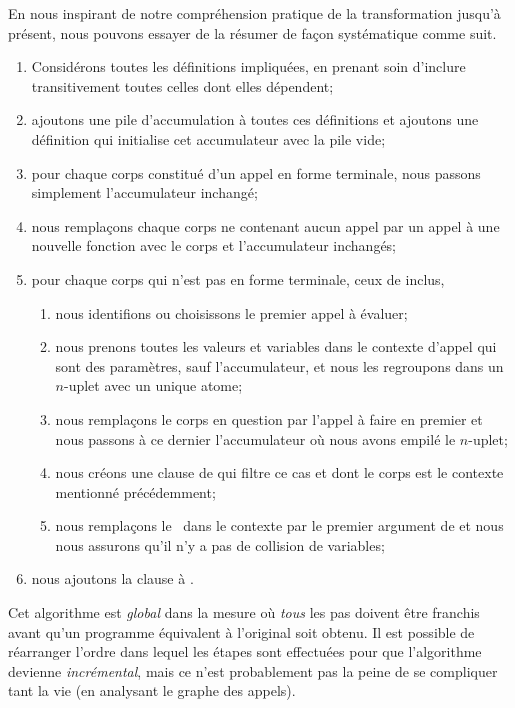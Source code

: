 En nous inspirant de notre compréhension pratique de la transformation
jusqu'à présent, nous pouvons essayer de la résumer de façon
systématique comme suit.
\begin{enumerate}

  \item Considérons toutes les définitions impliquées, en prenant soin
    d'inclure transitivement toutes celles dont elles dépendent;

  \item ajoutons une pile d'accumulation à toutes ces définitions et
    ajoutons une définition qui initialise cet accumulateur avec la
    pile vide;

  \item pour chaque corps constitué d'un appel en forme terminale,
    nous passons simplement l'accumulateur inchangé;

  \item nous remplaçons chaque corps ne contenant aucun appel par un
    appel à une nouvelle fonction  avec le corps et
    l'accumulateur inchangés;

  \item pour chaque corps qui n'est pas en forme terminale, ceux de 
     inclus,
    \begin{enumerate}

      \item nous identifions ou choisissons le premier appel à évaluer;

      \item nous prenons toutes les valeurs et variables dans le
        contexte d'appel qui sont des paramètres, sauf l'accumulateur,
        et nous les regroupons dans un \(n\)-uplet avec un unique atome;

      \item nous remplaçons le corps en question par l'appel à faire
        en premier et nous passons à ce dernier l'accumulateur où nous
        avons empilé le \(n\)-uplet;

      \item \label{add_appk1} nous créons une clause de
         qui filtre ce cas et dont le corps est le
        contexte mentionné précédemment;

      \item \label{add_appk2} nous remplaçons
        le~\erlcode{\textvisiblespace} dans le contexte par le premier
        argument de  et nous nous assurons qu'il n'y
        a pas de collision de variables;

    \end{enumerate}

  \item nous ajoutons la clause  à .

\end{enumerate}
Cet algorithme est \emph{global} dans la mesure où \emph{tous} les pas
doivent être franchis avant qu'un programme équivalent à l'original
soit obtenu. Il est possible de réarranger l'ordre dans lequel les
étapes sont effectuées pour que l'algorithme devienne
\emph{incrémental}, mais ce n'est probablement pas la peine de se
compliquer tant la vie (en analysant le graphe des appels).


